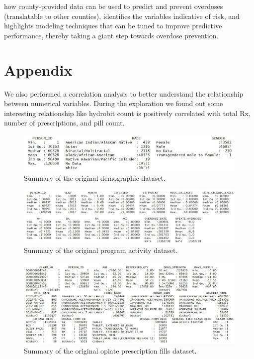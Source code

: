 \documentclass[twoside,10.5pt]{article}
\begin{document}
how county-provided data can be used to predict and prevent overdoses (translatable to other counties), identifies the variables indicative of risk, and highlights modeling techniques that can be tuned to improve predictive performance, thereby taking a giant step towards overdose prevention. 

\newpage
\appendix
\section*{Appendix}
We also performed a correlation analysis to better understand the relationship between numerical variables. During the exploration we found out some interesting relationship like hydrobit count is positively correlated with total Rx, number of prescriptions, and pill count.

\begin{figure}
\begin{center}
\includegraphics[width=5in]{images/original_dem_summary.JPG}
\end{center}
\caption{Summary of the original demographic dataset.}
\label{fig:orig_dem}
\end{figure}

\begin{figure}
\begin{center}
\includegraphics[width=6in]{images/original_prog_summary.JPG}
\end{center}
\caption{Summary of the original program activity dataset.}
\label{fig:orig_prog}
\end{figure}

\begin{figure}
\begin{center}
\includegraphics[width=6in]{images/original_presc_summary.JPG}
\end{center}
\caption{Summary of the original opiate prescription fills dataset.}
\label{fig:orig_presc}
\end{figure}
\end{document}
